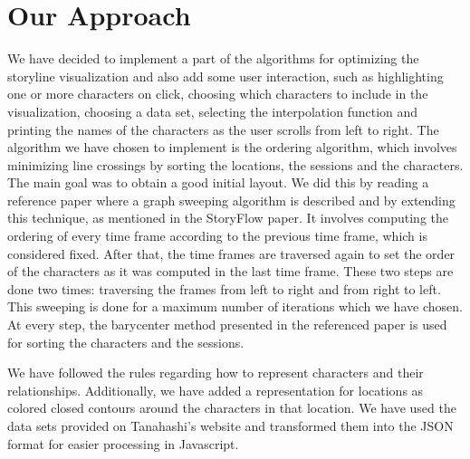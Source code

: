 \documentclass{report}
\begin{document}
\chapter{Our Approach}
\par
We have decided to implement a part of the algorithms for optimizing the storyline visualization and also add some user interaction, such as highlighting one or more characters on click, choosing which characters to include in the visualization, choosing a data set, selecting the interpolation function and printing the names of the characters as the user scrolls from left to right. The algorithm we have chosen to implement is the ordering algorithm, which involves minimizing line crossings by sorting the locations, the sessions and the characters. The main goal was to obtain a good initial layout. We did this by reading a reference paper \cite{4308636} where a graph sweeping algorithm is described and by extending this technique, as mentioned in the StoryFlow paper. It involves computing the ordering of every time frame according to the previous time frame, which is considered fixed. After that, the time frames are traversed again to set the order of the characters as it was computed in the last time frame. These two steps are done two times: traversing the frames from left to right and from right to left. This sweeping is done for a maximum number of iterations which we have chosen. At every step, the barycenter method presented in the referenced paper is used for sorting the characters and the sessions.
\par
We have followed the rules regarding how to represent characters and their relationships. Additionally, we have added a representation for locations as colored closed contours around the characters in that location. We have used the data sets provided on Tanahashi's website \cite{website:tanahashi} and transformed them into the JSON format for easier processing in Javascript.
\end{document}
